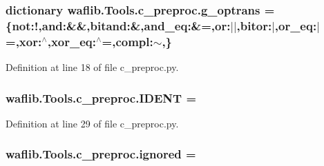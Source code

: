 \subsubsection[{\texorpdfstring{g\+\_\+optrans}{g_optrans}}]{\setlength{\rightskip}{0pt plus 5cm}dictionary waflib.\+Tools.\+c\+\_\+preproc.\+g\+\_\+optrans = \{\textquotesingle{}not\textquotesingle{}\+:\textquotesingle{}!\textquotesingle{},\textquotesingle{}and\textquotesingle{}\+:\textquotesingle{}\&\&\textquotesingle{},\textquotesingle{}bitand\textquotesingle{}\+:\textquotesingle{}\&\textquotesingle{},\textquotesingle{}and\+\_\+eq\textquotesingle{}\+:\textquotesingle{}\&=\textquotesingle{},\textquotesingle{}or\textquotesingle{}\+:\textquotesingle{}$\vert$$\vert$\textquotesingle{},\textquotesingle{}bitor\textquotesingle{}\+:\textquotesingle{}$\vert$\textquotesingle{},\textquotesingle{}or\+\_\+eq\textquotesingle{}\+:\textquotesingle{}$\vert$=\textquotesingle{},\textquotesingle{}xor\textquotesingle{}\+:\textquotesingle{}$^\wedge$\textquotesingle{},\textquotesingle{}xor\+\_\+eq\textquotesingle{}\+:\textquotesingle{}$^\wedge$=\textquotesingle{},\textquotesingle{}compl\textquotesingle{}\+:\textquotesingle{}$\sim$\textquotesingle{},\}}\hypertarget{namespacewaflib_1_1_tools_1_1c__preproc_a4dad61a7e636c7f3b883f62ddf5d6389}{}\label{namespacewaflib_1_1_tools_1_1c__preproc_a4dad61a7e636c7f3b883f62ddf5d6389}


Definition at line 18 of file c\+\_\+preproc.\+py.

\subsubsection[{\texorpdfstring{I\+D\+E\+NT}{IDENT}}]{ waflib.\+Tools.\+c\+\_\+preproc.\+I\+D\+E\+NT = \textquotesingle{}}\hypertarget{namespacewaflib_1_1_tools_1_1c__preproc_a087d7c61152f01f148e386953ca335da}{}\label{namespacewaflib_1_1_tools_1_1c__preproc_a087d7c61152f01f148e386953ca335da}


Definition at line 29 of file c\+\_\+preproc.\+py.

\subsubsection[{\texorpdfstring{ignored}{ignored}}]{ waflib.\+Tools.\+c\+\_\+preproc.\+ignored = \textquotesingle{}}\hypertarget{namespacewaflib_1_1_tools_1_1c__preproc_ad9aa4bbce47e172eeae63bdd8e456b79}{}\label{namespacewaflib_1_1_tools_1_1c__preproc_ad9aa4bbce47e172eeae63bdd8e456b79}



